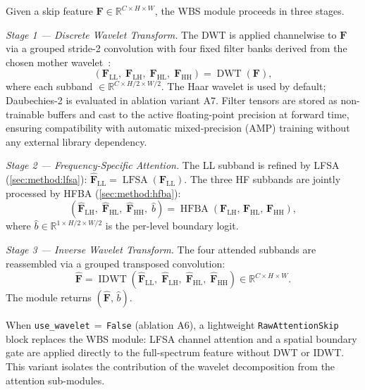 \documentclass[journal]{IEEEtran}
\begin{document}
Given a skip feature $\mathbf{F} \in \mathbb{R}^{C \times H \times W}$,
the WBS module proceeds in three stages.

\textit{Stage 1 — Discrete Wavelet Transform.}
The DWT is applied channelwise to $\mathbf{F}$ via a grouped stride-2
convolution with four fixed filter banks derived from the chosen mother
wavelet~\cite{mallat1989wavelet}:
\begin{equation}
  (\mathbf{F}_{\text{LL}},\;\mathbf{F}_{\text{LH}},\;
   \mathbf{F}_{\text{HL}},\;\mathbf{F}_{\text{HH}})
    = \operatorname{DWT}(\mathbf{F}),
  \label{eq:dwt}
\end{equation}
where each subband $\in \mathbb{R}^{C \times H/2 \times W/2}$.
The Haar wavelet is used by default; Daubechies-2 is evaluated in ablation
variant A7.
Filter tensors are stored as non-trainable buffers and cast to the active
floating-point precision at forward time, ensuring compatibility with automatic
mixed-precision (AMP) training without any external library dependency.

\textit{Stage 2 — Frequency-Specific Attention.}
The LL subband is refined by LFSA (\cref{sec:method:lfsa}):
$\hat{\mathbf{F}}_{\text{LL}} = \operatorname{LFSA}(\mathbf{F}_{\text{LL}})$.
The three HF subbands are jointly processed by HFBA (\cref{sec:method:hfba}):
\begin{equation}
  (\hat{\mathbf{F}}_{\text{LH}},\;\hat{\mathbf{F}}_{\text{HL}},\;
   \hat{\mathbf{F}}_{\text{HH}},\;\hat{b})
    = \operatorname{HFBA}(\mathbf{F}_{\text{LH}},\,
      \mathbf{F}_{\text{HL}},\,\mathbf{F}_{\text{HH}}),
  \label{eq:hfba_call}
\end{equation}
where $\hat{b} \in \mathbb{R}^{1 \times H/2 \times W/2}$ is the per-level
boundary logit.

\textit{Stage 3 — Inverse Wavelet Transform.}
The four attended subbands are reassembled via a grouped transposed convolution:
\begin{equation}
  \hat{\mathbf{F}} = \operatorname{IDWT}(\hat{\mathbf{F}}_{\text{LL}},\;
    \hat{\mathbf{F}}_{\text{LH}},\;\hat{\mathbf{F}}_{\text{HL}},\;
    \hat{\mathbf{F}}_{\text{HH}}) \in \mathbb{R}^{C \times H \times W}.
  \label{eq:idwt}
\end{equation}
The module returns $(\hat{\mathbf{F}},\,\hat{b})$.

When \texttt{use\_wavelet}\,$=$\,\texttt{False} (ablation A6), a lightweight
\texttt{RawAttentionSkip} block replaces the WBS module: LFSA channel
attention and a spatial boundary gate are applied directly to the full-spectrum
feature without DWT or IDWT.
This variant isolates the contribution of the wavelet decomposition from the
attention sub-modules.
\end{document}

